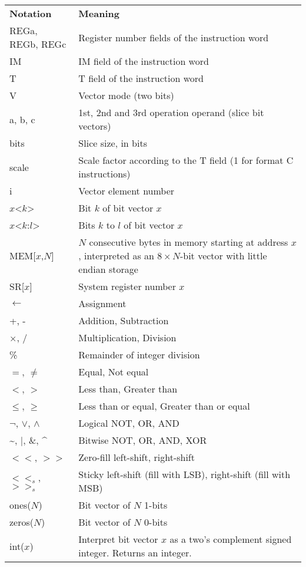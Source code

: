 \begin{tabular}{lp{340pt}}
\textbf{Notation} & \textbf{Meaning} \\
REGa, REGb, REGc & Register number fields of the instruction word \\
IM & IM field of the instruction word \\
T & T field of the instruction word \\
V & Vector mode (two bits) \\
a, b, c & 1st, 2nd and 3rd operation operand (slice bit vectors) \\
bits & Slice size, in bits \\
scale & Scale factor according to the T field (1 for format C instructions) \\
i & Vector element number \\
$x$<$k$> & Bit $k$ of bit vector $x$ \\
$x$<$k$:$l$> & Bits $k$ to $l$ of bit vector $x$ \\
MEM[$x$,$N$] & $N$ consecutive bytes in memory starting at address $x$,
               interpreted as an $8\times N$-bit vector with little endian
               storage \\
SR[$x$] & System register number $x$ \\
$\leftarrow$ & Assignment \\
+, - & Addition, Subtraction \\
$\times$, / & Multiplication, Division \\
\% & Remainder of integer division \\
$=$, $\neq$ & Equal, Not equal \\
$<$, $>$ & Less than, Greater than \\
$\leq$, $\geq$ & Less than or equal, Greater than or equal \\
$\neg$, $\vee$, $\wedge$ & Logical NOT, OR, AND \\
\textasciitilde, $|$, \&, \textasciicircum & Bitwise NOT, OR, AND, XOR \\
$<<$, $>>$ & Zero-fill left-shift, right-shift \\
$<<_{s}$, $>>_{s}$ & Sticky left-shift (fill with LSB), right-shift (fill with MSB) \\
ones($N$) & Bit vector of $N$ 1-bits \\
zeros($N$) & Bit vector of $N$ 0-bits \\
int($x$) & Interpret bit vector $x$ as a two's complement signed integer.
           Returns an integer. \\

\end{tabular}
